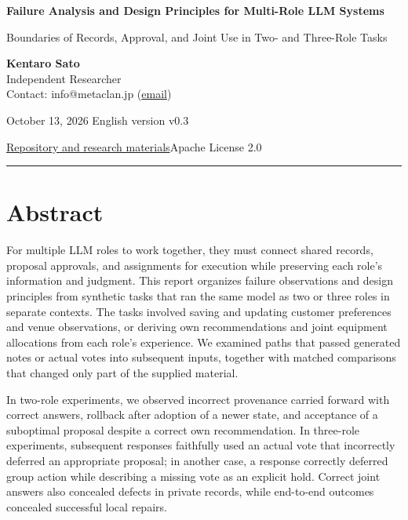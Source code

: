 \documentclass[10pt,a4paper]{article}
\begin{document}
\fontsize{10.7}{15.3}\selectfont\thispagestyle{first}
{\raggedright\sffamily\bfseries\color{ink}\fontsize{22}{27}\selectfont Failure Analysis and Design Principles for Multi-Role LLM Systems\par}

{\raggedright\sffamily\fontsize{13}{17}\selectfont\color{accent} Boundaries of Records, Approval, and Joint Use in Two- and Three-Role Tasks\par}

{\small \textbf{Kentaro Sato}\\
Independent Researcher\\
Contact: info@metaclan.jp (\href{mailto:info@metaclan.jp}{email})

October 13, 2026 \textbar{} English version v0.3\par}
{\small \href{https://github.com/metaSATOKEN/MRSI/tree/9443de315d283874df0c27e0e99b8c04f400709d}{Repository and research materials}\quad\textbar\quad Apache License 2.0\par}\smallskip\hrule\medskip

\section{Abstract}\label{two-role-failure-design-abstract}

For multiple LLM roles to work together, they must connect shared records, proposal approvals, and assignments for execution while preserving each role's information and judgment. This report organizes failure observations and design principles from synthetic tasks that ran the same model as two or three roles in separate contexts. The tasks involved saving and updating customer preferences and venue observations, or deriving own recommendations and joint equipment allocations from each role's experience. We examined paths that passed generated notes or actual votes into subsequent inputs, together with matched comparisons that changed only part of the supplied material.

In two-role experiments, we observed incorrect provenance carried forward with correct answers, rollback after adoption of a newer state, and acceptance of a suboptimal proposal despite a correct own recommendation. In three-role experiments, subsequent responses faithfully used an actual vote that incorrectly deferred an appropriate proposal; in another case, a response correctly deferred group action while describing a missing vote as an explicit hold. Correct joint answers also concealed defects in private records, while end-to-end outcomes concealed successful local repairs.
\end{document}
